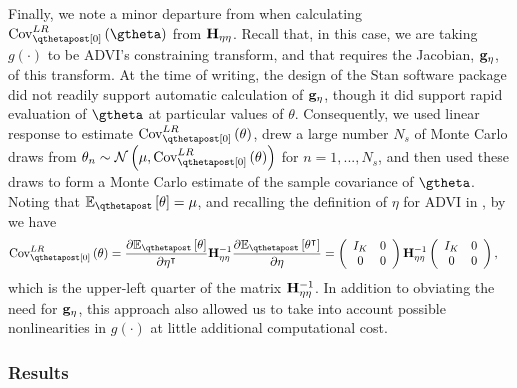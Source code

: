 \documentclass{article}\usepackage[]{graphicx}\usepackage[]{color}
\theoremstyle{definition}
\theoremstyle{plain}
\theoremstyle{plain}
\theoremstyle{plain}
\theoremstyle{definition}
\theoremstyle{plain}
\theoremstyle{plain}
\begin{document}
Finally, we note a minor departure from
 when calculating $\lrvbcov\left(\gtheta\right)$
from $\mathbf{H}_{\eta\eta}$.  Recall that, in this case, we are taking $g\left(\cdot\right)$
to be ADVI's constraining transform, and that 
requires the Jacobian, $\mathbf{g}_{\eta}$, of this transform.  At the time of writing,
the design of the Stan software package did not readily support automatic
calculation of $\mathbf{g}_{\eta}$, though it did support rapid evaluation of $\gtheta$ at
particular values of $\theta$.  Consequently, we used linear response to
estimate $\lrvbcov\left(\theta\right)$, drew a large number $N_{s}$ of
Monte Carlo draws from
$\theta_{n}\sim\mathcal{N}\left(\mu,\lrvbcov\left(\theta\right)\right)$ for
$n=1,...,N_{s}$, and then used these draws to form a Monte Carlo estimate of the
sample covariance of $\gtheta$.
Noting that $\mbeq\left[\theta\right]=\mu$, and recalling the definition
of $\eta$ for ADVI in ,
by  we have
\begin{align*}
\lrvbcov\left(\theta\right) & =
    \frac{\partial\mbeq\left[\theta\right]}{\partial\eta^{\trans}}
    \klhess^{-1}\frac{\partial\mbeq\left[\theta^{\trans}\right]}{\partial\eta} =
    \left(\begin{array}{cc}
I_{K} & 0\\
0 & 0
\end{array}\right)\klhess^{-1}\left(\begin{array}{cc}
I_{K} & 0\\
0 & 0
\end{array}\right),
\end{align*}
which is the upper-left quarter of the matrix $\mathbf{H}_{\eta\eta}^{-1}$.
In addition to obviating the need for $\mathbf{g}_{\eta}$,
this approach also allowed us to take into account possible nonlinearities in
$g\left(\cdot\right)$ at little additional computational cost.

\subsubsection{Results}
\end{document}
